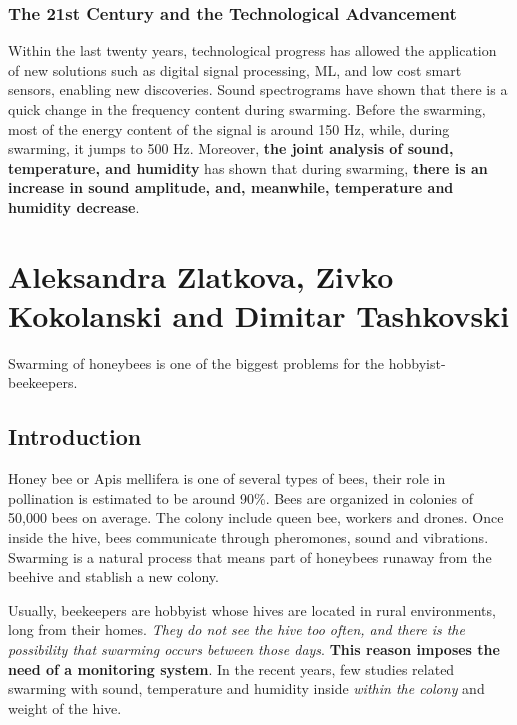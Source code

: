\documentclass[12pt]{report}
\begin{document}
	\subsection{The 21st Century and the Technological Advancement}
	
	Within the last twenty years, technological progress has allowed the application of new solutions such as digital signal processing, ML, and low cost smart sensors, enabling new discoveries. Sound spectrograms have shown that there is a quick change in the frequency content during swarming. Before the swarming, most of the energy content of the signal is around 150 Hz, while, during swarming, it jumps to 500 Hz. Moreover, \textbf{the joint analysis of sound, temperature, and humidity} has shown that during swarming, \textbf{there is an increase in sound amplitude, and, meanwhile, temperature and humidity decrease}.
	
	
	\chapter{Aleksandra Zlatkova, Zivko Kokolanski and Dimitar Tashkovski}
	
	Swarming of honeybees is one of the biggest problems for the hobbyist-beekeepers.
	
	\section{Introduction}
	
	Honey bee or Apis mellifera is one of several types of bees, their role in pollination is estimated to be around 90\%. Bees are organized in colonies of 50,000 bees on average. The colony include queen bee, workers and drones. Once inside the hive, bees communicate through pheromones, sound and vibrations. Swarming is a natural process that means part of honeybees runaway from the beehive and stablish a new colony. 
	
	\par Usually, beekeepers are hobbyist whose hives are located in rural environments, long from their homes. \textit{They do not see the hive too often, and there is the possibility that swarming occurs between those days}. \textbf{This reason imposes the need of a monitoring system}. In the recent years, few studies related swarming with sound, temperature and humidity inside \textit{within the colony} and weight of the hive.
	
\end{document}
